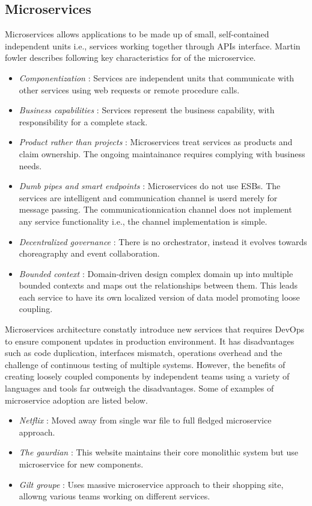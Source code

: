 \documentclass[conference]{IEEEtran}
\begin{document}
\subsection{Microservices}
Microservices \cite{microservice} allows applications to be made up of small, self-contained independent units i.e., services working together through APIs interface. Martin fowler \cite{microservice} describes following key characteristics for of the microservice.
\begin{itemize}
\item \textit{Componentization} : Services are independent units that communicate with other services using web requests or remote procedure calls.
\item \textit{Business capabilities} :  Services represent the business capability, with responsibility for a complete stack.
\item \textit{Product rather than projects} : Microservices treat services as products and claim ownership. The ongoing maintainance requires complying with business needs.
\item \textit{Dumb pipes and smart endpoints} : Microservices do not use ESBs. The services are intelligent and communication channel is userd merely for message passing. The communicationnication channel does not implement any service functionality i.e., the channel implementation is simple.
\item \textit{Decentralized governance} : There is no orchestrator, instead it evolves towards choreagraphy and event collaboration.
\item \textit{Bounded context} : Domain-driven design complex domain up into multiple bounded contexts and maps out the relationships between them. This leads each service to have its own localized version of data model promoting loose coupling.
\end{itemize}

Microservices architecture constatly introduce new services that requires DevOps to ensure component updates in production environment. 
It has disadvantages such as code duplication, interfaces mismatch, operations overhead and the challenge of continuous testing of multiple systems. However, the benefits of creating loosely coupled components by independent teams using a variety of languages and tools far outweigh the disadvantages. Some of examples of microservice adoption are listed below.

\begin{itemize}
\item \textit{Netflix} : Moved away from single war file to full fledged microservice approach.
\item \textit{The gaurdian} : This website maintains their core monolithic system but use microservice for new components.
\item \textit{Gilt groupe} : Uses massive microservice approach to their shopping site, allowng various teams working on different services.
\end {itemize}
\end{document}
